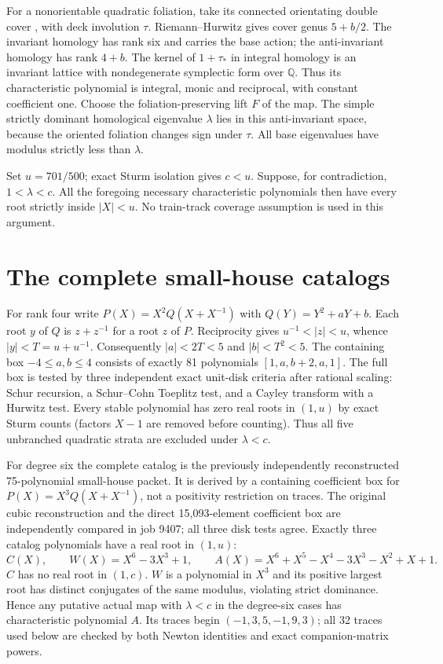 \documentclass[11pt]{article}
\begin{document}
For a nonorientable quadratic foliation, take its connected orientating
double cover \cite[Construction 2.1]{LT}, with deck involution $\tau$.
Riemann--Hurwitz gives cover genus $5+b/2$. The invariant homology has rank
six and carries the base action; the anti-invariant homology has rank $4+b$.
The kernel of $1+\tau_*$ in integral homology is an invariant lattice with
nondegenerate symplectic form over $\mathbb Q$. Thus its characteristic
polynomial is integral, monic and reciprocal, with constant coefficient one.
Choose the foliation-preserving lift $F$ of the map. The simple strictly
dominant homological eigenvalue $\lambda$ lies in this anti-invariant space,
because the oriented foliation changes sign under $\tau$. All base
eigenvalues have modulus strictly less than $\lambda$.

Set $u=701/500$; exact Sturm isolation gives $c<u$.
Suppose, for contradiction, $1<\lambda<c$. All the foregoing necessary
characteristic polynomials then have every root strictly inside $|X|<u$.
No train-track coverage assumption is used in this argument.

\section{The complete small-house catalogs}
For rank four write $P(X)=X^2 Q(X+X^{-1})$ with
$Q(Y)=Y^2+aY+b$. Each root $y$ of $Q$ is $z+z^{-1}$ for a root $z$ of
$P$. Reciprocity gives $u^{-1}<|z|<u$, whence
$|y|<T=u+u^{-1}$. Consequently $|a|<2T<5$ and $|b|<T^2<5$.
The containing box $-4\leq a,b\leq4$ consists of exactly 81 polynomials
$[1,a,b+2,a,1]$. The full box is tested by three independent exact unit-disk
criteria after rational scaling: Schur recursion, a Schur--Cohn Toeplitz
test, and a Cayley transform with a Hurwitz test. Every stable polynomial
has zero real roots in $(1,u)$ by exact Sturm counts (factors $X-1$ are
removed before counting). Thus all five unbranched quadratic strata are
excluded under $\lambda<c$.

For degree six the complete catalog is the previously independently
reconstructed 75-polynomial small-house packet. It is derived by a
containing coefficient box for $P(X)=X^3Q(X+X^{-1})$, not a positivity
restriction on traces. The original cubic reconstruction and the direct
15,093-element coefficient box are independently compared in job 9407;
all three disk tests agree. Exactly three catalog polynomials have a real
root in $(1,u)$:
\[
 C(X),\qquad W(X)=X^6-3X^3+1,\qquad
 A(X)=X^6+X^5-X^4-3X^3-X^2+X+1.
\]
$C$ has no real root in $(1,c)$. $W$ is a polynomial in $X^3$ and its
positive largest root has distinct conjugates of the same modulus, violating
strict dominance. Hence any putative actual map with $\lambda<c$ in the
degree-six cases has characteristic polynomial $A$. Its traces begin
$(-1,3,5,-1,9,3)$; all 32 traces used below are checked by both Newton
identities and exact companion-matrix powers.
\end{document}
